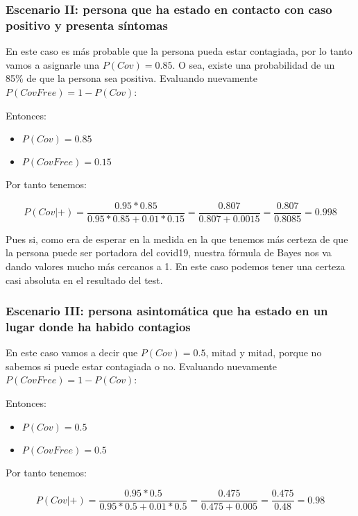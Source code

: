 \documentclass[10pt,a4paper]{article}
\begin{document}
\subsubsection{Escenario II: persona que ha estado en contacto con caso positivo y presenta síntomas}

En este caso es más probable que la persona pueda estar contagiada, por lo tanto vamos a asignarle una $P(Cov) = 0.85$. O sea, existe una probabilidad de un 85\% de que la persona sea positiva. Evaluando nuevamente $P(CovFree) = 1 - P(Cov)$:

Entonces:

\begin{itemize}
\item $P(Cov) = 0.85$
\item $P(CovFree) = 0.15$
\end{itemize}


Por tanto tenemos:

\begin{equation*}
P(Cov|+) = \frac{0.95*0.85}{0.95*0.85 + 0.01*0.15} = \frac{0.807}{0.807 + 0.0015} = \frac{0.807}{0.8085} = 0.998
\end{equation*}

Pues si, como era de esperar en la medida en la que tenemos más certeza de que la persona puede ser portadora del covid19, nuestra fórmula de Bayes nos va dando valores mucho más cercanos a 1. En este caso podemos tener una certeza casi absoluta en el resultado del test.

\subsubsection{Escenario III: persona asintomática que ha estado en un lugar donde ha habido contagios}

En este caso vamos a decir que $P(Cov) = 0.5$, mitad y mitad, porque no sabemos si puede estar contagiada o no. Evaluando nuevamente $P(CovFree) = 1 - P(Cov)$:

Entonces:

\begin{itemize}
\item $P(Cov) = 0.5$
\item $P(CovFree) = 0.5$
\end{itemize}

Por tanto tenemos:

\begin{equation*}
P(Cov|+) = \frac{0.95*0.5}{0.95*0.5 + 0.01*0.5} = \frac{0.475}{0.475 + 0.005} = \frac{0.475}{0.48} = 0.98
\end{equation*}
\end{document}
